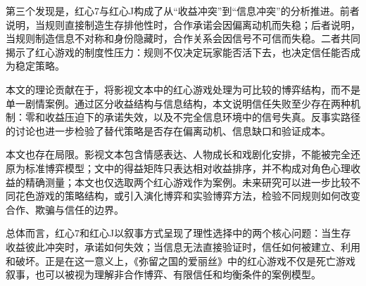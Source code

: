\documentclass{article}
\begin{document}
第三个发现是，红心7与红心J构成了从“收益冲突”到“信息冲突”的分析推进。前者说明，当规则直接制造生存排他性时，合作承诺会因偏离动机而失稳；后者说明，当规则制造信息不对称和身份隐藏时，合作关系会因信号不可信而失稳。二者共同揭示了红心游戏的制度性压力：规则不仅决定玩家能否活下去，也决定信任能否成为稳定策略。

本文的理论贡献在于，将影视文本中的红心游戏处理为可比较的博弈结构，而不是单一剧情案例。通过区分收益结构与信息结构，本文说明信任失败至少存在两种机制：零和收益压迫下的承诺失效，以及不完全信息环境中的信号失真。反事实路径的讨论也进一步检验了替代策略是否存在偏离动机、信息缺口和验证成本。

本文也存在局限。影视文本包含情感表达、人物成长和戏剧化安排，不能被完全还原为标准博弈模型；文中的得益矩阵只表达相对收益排序，并不构成对角色心理收益的精确测量；本文也仅选取两个红心游戏作为案例。未来研究可以进一步比较不同花色游戏的策略结构，或引入演化博弈和实验博弈方法，检验不同规则如何改变合作、欺骗与信任的边界。

总体而言，红心7和红心J以叙事方式呈现了理性选择中的两个核心问题：当生存收益彼此冲突时，承诺如何失效；当信息无法直接验证时，信任如何被建立、利用和破坏。正是在这一意义上，《弥留之国的爱丽丝》中的红心游戏不仅是死亡游戏叙事，也可以被视为理解非合作博弈、有限信任和均衡条件的案例模型。



\end{document}
